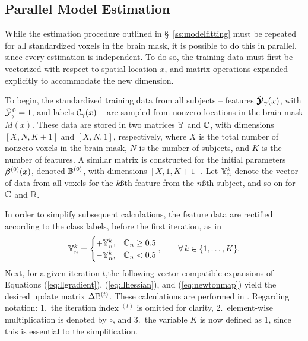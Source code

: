 \subsection{Parallel Model Estimation}\label{s:parallelfit}
While the estimation procedure outlined in \S~\ref{ss:modelfitting}
must be repeated for all standardized voxels in the brain mask,
it is possible to do this in parallel, since every estimation is independent.
To do so, the training data must first be vectorized with respect to spatial location $x$,
and matrix operations expanded explicitly to accommodate the new dimension.
\par
To begin, the standardized training data from all subjects
-- features $\tilde{\bm{\mathcal{Y}}}_{\gamma}(x)$, with $\tilde{\mathcal{Y}}_{\gamma}^{\thinspace0}=1$,
and labels $\mathcal{C}_{\gamma}(x)$ --
are sampled from nonzero locations in the brain mask $M(x)$.
These data are stored in two matrices $\mathbb{Y}$ and $\mathbb{C}$,
with dimensions $[X,N,K+1]$ and $[X,N,1]$, respectively, where
$X$ is the total number of nonzero voxels in the brain mask,
$N$ is the number of subjects, and
$K$ is the number of features.
A similar matrix is constructed for the initial parameters $\bm{\beta}^{(0)}(x)$, denoted $\mathbb{B}^{(0)}$,
with dimensions $[X,1,K+1]$.
Let $\mathbb{Y}_n^k$ denote the vector of data
from all voxels for the $k$\ss{th} feature from the $n$\ss{th} subject,
and so on for $\mathbb{C}$ and $\mathbb{B}$.
\par
In order to simplify subsequent calculations,
the feature data are rectified according to the class labels,
before the first iteration, as in
\begin{equation}
  \mathbb{Y}_n^k =
  \begin{cases}
    +\mathbb{Y}_n^k, & \mathbb{C}_n \ge 0.5\\
    -\mathbb{Y}_n^k, & \mathbb{C}_n  <  0.5\\
  \end{cases},\qquad\forall\thinspace k \in \{1,\dots,K\}.
\end{equation}
Next, for a given iteration $t$,the following vector-compatible expansions of Equations
(\ref{eq:llgradient}), (\ref{eq:llhessian}), and (\ref{eq:newtonmap})
yield the desired update matrix $\Delta\mathbb{B}^{(t)}$.
These calculations are performed in .
Regarding notation:
1.\ the iteration index ${}^{(t)}$ is omitted for clarity,
2.\ element-wise multiplication is denoted by $\circ$, and
3.\ the variable $K$ is now defined as $1$, since this is essential to the simplification.
\par
